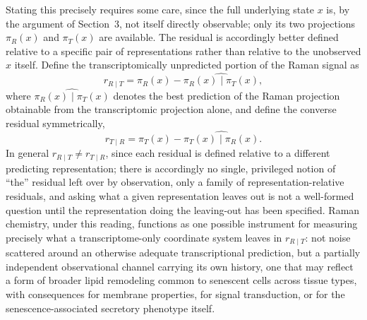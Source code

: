 \documentclass[11pt]{article}
\begin{document}
Stating this precisely requires some care, since the full underlying state $x$ is, by the argument of Section~3, not itself directly observable; only its two projections $\pi_R(x)$ and $\pi_T(x)$ are available. The residual is accordingly better defined relative to a specific pair of representations rather than relative to the unobserved $x$ itself. Define the transcriptomically unpredicted portion of the Raman signal as
\begin{equation}
r_{R \mid T} = \pi_R(x) - \widehat{\pi_R(x) \mid \pi_T(x)},
\end{equation}
where $\widehat{\pi_R(x) \mid \pi_T(x)}$ denotes the best prediction of the Raman projection obtainable from the transcriptomic projection alone, and define the converse residual symmetrically,
\begin{equation}
r_{T \mid R} = \pi_T(x) - \widehat{\pi_T(x) \mid \pi_R(x)}.
\end{equation}
In general $r_{R \mid T} \neq r_{T \mid R}$, since each residual is defined relative to a different predicting representation; there is accordingly no single, privileged notion of ``the'' residual left over by observation, only a family of representation-relative residuals, and asking what a given representation leaves out is not a well-formed question until the representation doing the leaving-out has been specified. Raman chemistry, under this reading, functions as one possible instrument for measuring precisely what a transcriptome-only coordinate system leaves in $r_{R \mid T}$: not noise scattered around an otherwise adequate transcriptional prediction, but a partially independent observational channel carrying its own history, one that may reflect a form of broader lipid remodeling common to senescent cells across tissue types, with consequences for membrane properties, for signal transduction, or for the senescence-associated secretory phenotype itself.
\end{document}
